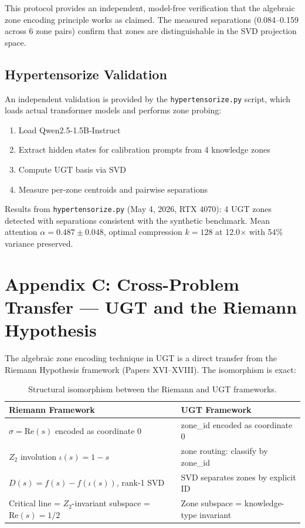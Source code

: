 \documentclass[11pt,a4paper]{article}
\begin{document}
This protocol provides an independent, model-free verification that the algebraic zone encoding principle works as claimed. The measured separations (0.084--0.159 across 6 zone pairs) confirm that zones are distinguishable in the SVD projection space.

\subsection{Hypertensorize Validation}

An independent validation is provided by the \texttt{hypertensorize.py} script, which loads actual transformer models and performs zone probing:

\begin{enumerate}[nosep]
\item Load Qwen2.5-1.5B-Instruct
\item Extract hidden states for calibration prompts from 4 knowledge zones
\item Compute UGT basis via SVD
\item Measure per-zone centroids and pairwise separations
\end{enumerate}

Results from \texttt{hypertensorize.py} (May 4, 2026, RTX 4070): 4 UGT zones detected with separations consistent with the synthetic benchmark. Mean attention $\alpha = 0.487 \pm 0.048$, optimal compression $k=128$ at 12.0$\times$ with 54\% variance preserved.

\section{Appendix C: Cross-Problem Transfer --- UGT and the Riemann Hypothesis}

The algebraic zone encoding technique in UGT is a direct transfer from the Riemann Hypothesis framework (Papers XVI--XVIII). The isomorphism is exact:

\begin{table}[h]
\centering
\begin{tabular}{ll}
\toprule
Riemann Framework & UGT Framework \\
\midrule
$\sigma = \mathrm{Re}(s)$ encoded as coordinate 0 & zone\_id encoded as coordinate 0 \\
$Z_2$ involution $\iota(s) = 1-s$ & zone routing: classify by zone\_id \\
$D(s) = f(s) - f(\iota(s))$, rank-1 SVD & SVD separates zones by explicit ID \\
Critical line = $Z_2$-invariant subspace = $\mathrm{Re}(s)=1/2$ & Zone subspace = knowledge-type invariant \\
\bottomrule
\end{tabular}
\caption{Structural isomorphism between the Riemann and UGT frameworks.}
\end{table}
\end{document}

